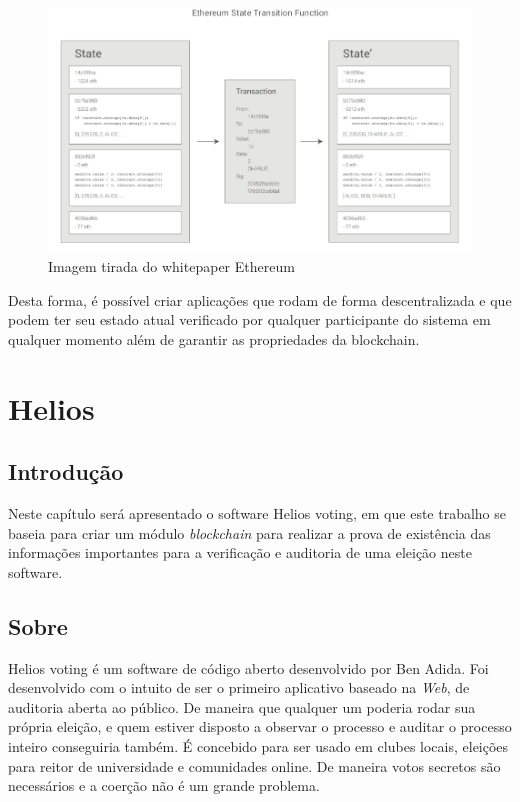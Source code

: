 \documentclass{ufsctex/ufsctex}
\begin{document}
\begin{figure}[h]
	\centering
	\includegraphics[scale=0.3]{ethereum}
	\caption{Imagem tirada do whitepaper Ethereum}
	\label{fig:ethereum}
\end{figure}

Desta forma, é possível criar aplicações que rodam de forma descentralizada e
que podem ter seu estado atual verificado por qualquer participante do sistema
em qualquer momento além de garantir as propriedades da blockchain.

\chapter{Helios}

\section{Introdução}

Neste capítulo será apresentado o software Helios voting, em que este trabalho
se baseia para criar um módulo \textit{blockchain} para realizar a prova de
existência das informações importantes para a verificação e auditoria de uma
eleição neste software.

\section{Sobre}

Helios voting é um software de código aberto desenvolvido por Ben Adida. Foi
desenvolvido com o intuito de ser o primeiro aplicativo baseado na
\textit{Web}, de auditoria aberta ao público. De maneira que qualquer um
poderia rodar sua própria eleição, e quem estiver disposto a observar o
processo e auditar o processo inteiro conseguiria também. É concebido para ser
usado em clubes locais, eleições para reitor de universidade e comunidades
online. De maneira votos secretos são necessários e a coerção não é um grande
problema.\cite{benAdida}
\end{document}
